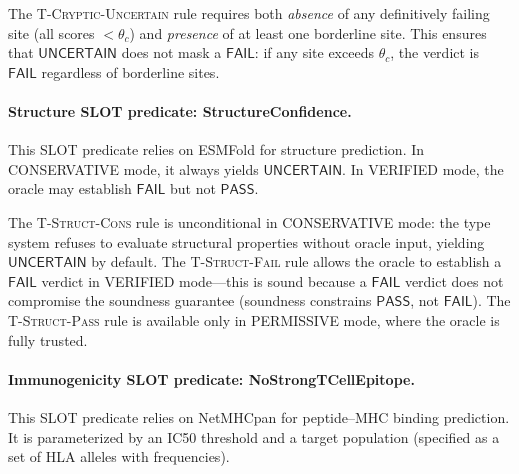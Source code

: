 \documentclass[acmsmall,review,anonymous]{acmart}
\newcommand{\PASS}{\ensuremath{\mathsf{PASS}}\xspace}
\newcommand{\FAIL}{\ensuremath{\mathsf{FAIL}}\xspace}
\newcommand{\UNCERTAIN}{\ensuremath{\mathsf{UNCERTAIN}}\xspace}
\newcommand{\seq}{\sigma}
\newcommand{\judg}[3]{#1 \vdash #2 : #3}
\begin{document}
\noindent The \textsc{T-Cryptic-Uncertain} rule requires both
\emph{absence} of any definitively failing site (all scores $<
\theta_c$) and \emph{presence} of at least one borderline site.
This ensures that \UNCERTAIN{} does not mask a \FAIL: if any site
exceeds $\theta_c$, the verdict is \FAIL{} regardless of borderline
sites.

\paragraph{Structure SLOT predicate: StructureConfidence.}
This SLOT predicate relies on ESMFold for structure prediction.
In CONSERVATIVE mode, it always yields \UNCERTAIN{}.
In VERIFIED mode, the oracle may establish \FAIL{} but not \PASS.


\noindent The \textsc{T-Struct-Cons} rule is unconditional in
CONSERVATIVE mode: the type system refuses to evaluate structural
properties without oracle input, yielding \UNCERTAIN{} by default.
The \textsc{T-Struct-Fail} rule allows the oracle to establish a
\FAIL{} verdict in VERIFIED mode---this is sound because a \FAIL{}
verdict does not compromise the soundness guarantee (soundness
constrains \PASS{}, not \FAIL).
The \textsc{T-Struct-Pass} rule is available only in PERMISSIVE mode,
where the oracle is fully trusted.

\paragraph{Immunogenicity SLOT predicate: NoStrongTCellEpitope.}
This SLOT predicate relies on NetMHCpan for peptide--MHC binding
prediction.
It is parameterized by an IC50 threshold and a target population
(specified as a set of HLA alleles with frequencies).
\end{document}
